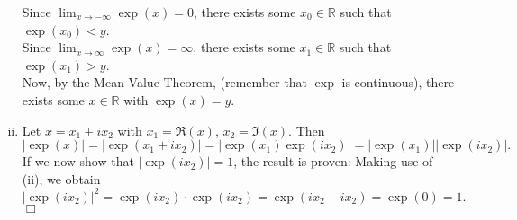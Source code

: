 \begin{enumerate}[(i)]
Since $\lim_{x\to-\infty}\exp(x)=0$, there exists some $x_0\in\mathbb{R}$ such that $\exp(x_0)<y$.\\
Since $\lim_{x\to\infty}\exp(x)=\infty$, there exists some $x_1\in\mathbb{R}$ such that $\exp(x_1)>y$.\\
Now, by the Mean Value Theorem, (remember that $\exp$ is continuous), there exists some $x\in\mathbb{R}$ with $\exp(x)=y$.
\item Let $x=x_1+ix_2$ with $x_1=\Re(x)$, $x_2=\Im(x)$. Then
\[
 | \exp(x) | =
|\exp(x_1+ix_2)|=|\exp(x_1)\exp(ix_2)|=|\exp(x_1)||\exp(ix_2)|.\]
If we now show that $|\exp(ix_2)|=1$, the result is proven:
Making use of (ii), we obtain
\[|\exp(ix_2)|^2=\exp(ix_2)\cdot\overline{\exp(ix_2)}=\exp(ix_2-ix_2)=\exp(0)=1.\]\hfill$\Box$
\end{enumerate}


